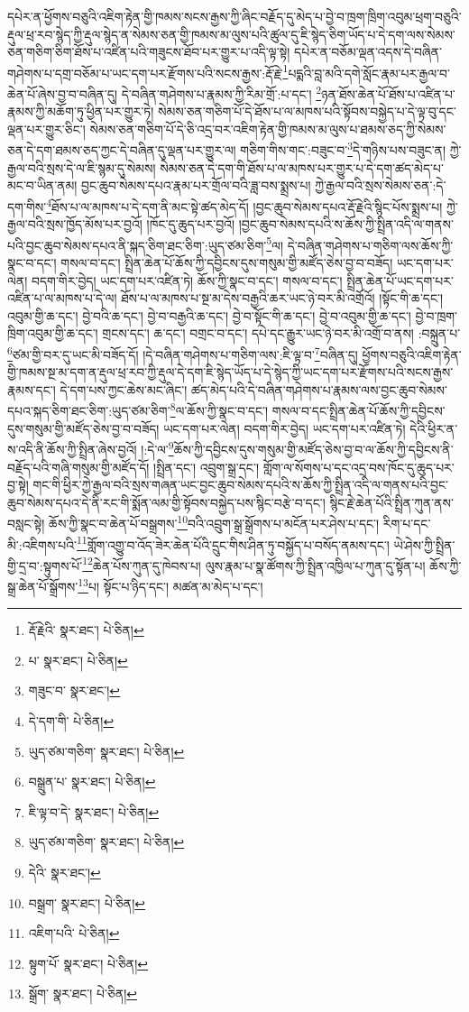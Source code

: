 དཔེར་ན་ཕྱོགས་བཅུའི་འཇིག་རྟེན་གྱི་ཁམས་སངས་རྒྱས་ཀྱི་ཞིང་བརྗོད་དུ་མེད་པ་བྱེ་བ་ཁྲག་ཁྲིག་འབུམ་ཕྲག་བཅུའི་རྡུལ་ཕྲ་རབ་སྙེད་ཀྱི་རྡུལ་སྙེད་ན་སེམས་ཅན་གྱི་ཁམས་མ་ལུས་པའི་ཚུལ་དུ་ཇི་སྙེད་ཅིག་ཡོད་པ་དེ་དག་ལས་སེམས་ཅན་གཅིག་ཅིག་ཐོས་པ་འཛིན་པའི་གཟུངས་ཐོབ་པར་གྱུར་པ་འདི་ལྟ་སྟེ། དཔེར་ན་བཅོམ་ལྡན་འདས་དེ་བཞིན་གཤེགས་པ་དགྲ་བཅོམ་པ་ཡང་དག་པར་རྫོགས་པའི་སངས་རྒྱས་:རྡོ་རྗེ་\footnote{རྡོ་རྗེའི་  སྣར་ཐང་།  པེ་ཅིན། }པདྨའི་བླ་མའི་དགེ་སློང་རྣམ་པར་རྒྱལ་བ་ཆེན་པོ་ཞེས་བྱ་བ་བཞིན་དུ། དེ་བཞིན་གཤེགས་པ་རྣམས་ཀྱི་རིམ་གྲོ་:པ་དང་། \footnote{པ་  སྣར་ཐང་།  པེ་ཅིན། }ཉན་ཐོས་ཆེན་པོ་ཐོས་པ་འཛིན་པ་རྣམས་ཀྱི་མཆོག་ཏུ་ཕྱིན་པར་གྱུར་ཏེ། སེམས་ཅན་གཅིག་པོ་དེ་ཐོས་པ་ལ་མཁས་པའི་སྟོབས་བསྐྱེད་པ་དེ་ལྟ་བུ་དང་ལྡན་པར་གྱུར་ཅིང་། སེམས་ཅན་གཅིག་པོ་དེ་ཅི་འདྲ་བར་འཇིག་རྟེན་གྱི་ཁམས་མ་ལུས་པ་ཐམས་ཅད་ཀྱི་སེམས་ཅན་དེ་དག་ཐམས་ཅད་ཀྱང་དེ་བཞིན་དུ་ལྡན་པར་གྱུར་ལ། གཅིག་གིས་གང་:བཟུང་བ་\footnote{གཟུང་བ་  སྣར་ཐང་། }དེ་གཉིས་པས་བཟུང་ན། ཀྱེ་རྒྱལ་བའི་སྲས་དེ་ལ་ཇི་སྙམ་དུ་སེམས། སེམས་ཅན་དེ་དག་གི་ཐོས་པ་ལ་མཁས་པར་གྱུར་པ་དེ་དག་ཚད་མེད་པ་མང་བ་ཡིན་ནམ། བྱང་ཆུབ་སེམས་དཔའ་རྣམ་པར་གྲོལ་བའི་ཟླ་བས་སྨྲས་པ། ཀྱེ་རྒྱལ་བའི་སྲས་སེམས་ཅན་:དེ་དག་གིས་\footnote{དེ་དག་གི་  པེ་ཅིན། }ཐོས་པ་ལ་མཁས་པ་དེ་དག་ནི་མང་སྟེ་ཚད་མེད་དོ། །བྱང་ཆུབ་སེམས་དཔའ་རྡོ་རྗེའི་སྙིང་པོས་སྨྲས་པ། ཀྱེ་རྒྱལ་བའི་སྲས་ཁྱོད་མོས་པར་བྱའོ། །ཁོང་དུ་ཆུད་པར་བྱའོ། །བྱང་ཆུབ་སེམས་དཔའི་ས་ཆོས་ཀྱི་སྤྲིན་འདི་ལ་གནས་པའི་བྱང་ཆུབ་སེམས་དཔའ་ནི་སྐད་ཅིག་ཐང་ཅིག་:ཡུད་ཙམ་ཅིག་\footnote{ཡུད་ཙམ་གཅིག་  སྣར་ཐང་།  པེ་ཅིན། }ལ། དེ་བཞིན་གཤེགས་པ་གཅིག་ལས་ཆོས་ཀྱི་སྣང་བ་དང་། གསལ་བ་དང་། སྤྲིན་ཆེན་པོ་ཆོས་ཀྱི་དབྱིངས་དུས་གསུམ་གྱི་མཛོད་ཅེས་བྱ་བ་བཟོད། ཡང་དག་པར་ལེན། བདག་གིར་བྱེད། ཡང་དག་པར་འཛིན་ཏེ། ཆོས་ཀྱི་སྣང་བ་དང་། གསལ་བ་དང་། སྤྲིན་ཆེན་པོ་ཡང་དག་པར་འཛིན་པ་ལ་མཁས་པ་དེ་ལ། ཐོས་པ་ལ་མཁས་པ་སྔ་མ་དེས་བརྒྱའི་ཆར་ཡང་ཉེ་བར་མི་འགྲོའོ། །སྟོང་གི་ཆ་དང་། འབུམ་གྱི་ཆ་དང་། བྱེ་བའི་ཆ་དང་། བྱེ་བ་བརྒྱའི་ཆ་དང་། བྱེ་བ་སྟོང་གི་ཆ་དང་། བྱེ་བ་འབུམ་གྱི་ཆ་དང་། བྱེ་བ་ཁྲག་ཁྲིག་འབུམ་གྱི་ཆ་དང་། གྲངས་དང་། ཆ་དང་། བགྲང་བ་དང་། དཔེ་དང་རྒྱུར་ཡང་ཉེ་བར་མི་འགྲོ་བ་ནས། :བསྐྲུན་པ་\footnote{བསྒྲུན་པ་  སྣར་ཐང་།  པེ་ཅིན། }ཙམ་གྱི་བར་དུ་ཡང་མི་བཟོད་དོ། །དེ་བཞིན་གཤེགས་པ་གཅིག་ལས་:ཇི་ལྟ་བ་\footnote{ཇི་ལྟ་བ་དེ་  སྣར་ཐང་།  པེ་ཅིན། }བཞིན་དུ། ཕྱོགས་བཅུའི་འཇིག་རྟེན་གྱི་ཁམས་སྔ་མ་དག་ན་རྡུལ་ཕྲ་རབ་ཀྱི་རྡུལ་དེ་དག་ཇི་སྙེད་ཡོད་པ་དེ་སྙེད་ཀྱི་ཡང་དག་པར་རྫོགས་པའི་སངས་རྒྱས་རྣམས་དང་། དེ་དག་པས་ཀྱང་ཆེས་མང་ཞིང་། ཚད་མེད་པའི་དེ་བཞིན་གཤེགས་པ་རྣམས་ལས་བྱང་ཆུབ་སེམས་དཔའ་སྐད་ཅིག་ཐང་ཅིག་:ཡུད་ཙམ་ཅིག་\footnote{ཡུད་ཙམ་གཅིག་  སྣར་ཐང་།  པེ་ཅིན། }ལ་ཆོས་ཀྱི་སྣང་བ་དང་། གསལ་བ་དང་སྤྲིན་ཆེན་པོ་ཆོས་ཀྱི་དབྱིངས་དུས་གསུམ་གྱི་མཛོད་ཅེས་བྱ་བ་བཟོད། ཡང་དག་པར་ལེན། བདག་གིར་བྱེད། ཡང་དག་པར་འཛིན་ཏེ། དེའི་ཕྱིར་ན་ས་འདི་ནི་ཆོས་ཀྱི་སྤྲིན་ཞེས་བྱའོ། །:དེ་ལ་\footnote{དེའི་  སྣར་ཐང་། }ཆོས་ཀྱི་དབྱིངས་དུས་གསུམ་གྱི་མཛོད་ཅེས་བྱ་བ་ལ་ཆོས་ཀྱི་དབྱིངས་ནི་བརྗོད་པའི་གཞི་གསུམ་གྱི་མཛོད་དོ། །སྤྲིན་དང་། འབྲུག་སྒྲ་དང་། གློག་ལ་སོགས་པ་དང་འདྲ་བས་ཁོང་དུ་ཆུད་པར་བྱ་སྟེ། གང་གི་ཕྱིར་ཀྱེ་རྒྱལ་བའི་སྲས་གཞན་ཡང་བྱང་ཆུབ་སེམས་དཔའི་ས་ཆོས་ཀྱི་སྤྲིན་འདི་ལ་གནས་པའི་བྱང་ཆུབ་སེམས་དཔའ་དེ་ནི་རང་གི་སྨོན་ལམ་གྱི་སྟོབས་བསྐྱེད་པས་སྙིང་བརྩེ་བ་དང་། སྙིང་རྗེ་ཆེན་པོའི་སྤྲིན་ཀུན་ནས་བསླང་སྟེ། ཆོས་ཀྱི་སྣང་བ་ཆེན་པོ་བསྒྲགས་\footnote{བསྒྲག་  སྣར་ཐང་།  པེ་ཅིན། }བའི་འབྲུག་སྒྲ་སྒྲོགས་པ་མངོན་པར་ཤེས་པ་དང་། རིག་པ་དང་མི་:འཇིགས་པའི་\footnote{འཇིག་པའི་  པེ་ཅིན། }གློག་འགྱུ་བ་འོད་ཟེར་ཆེན་པོའི་དྲུང་གིས་ཤིན་ཏུ་བསྐྱོད་པ་བསོད་ནམས་དང་། ཡེ་ཤེས་ཀྱི་སྤྲིན་གྱི་དྲ་བ་:སྟུགས་པོ་\footnote{སྟུག་པོ་  སྣར་ཐང་།  པེ་ཅིན། }ཆེན་པོས་ཀུན་དུ་ཁེབས་པ། ལུས་རྣམ་པ་སྣ་ཚོགས་ཀྱི་སྤྲིན་འཁྱིལ་པ་ཀུན་དུ་སྟོན་པ། ཆོས་ཀྱི་སྒྲ་ཆེན་པོ་སྒྲོགས་\footnote{སྒྲོག་  སྣར་ཐང་།  པེ་ཅིན། }པ། སྟོང་པ་ཉིད་དང་། མཚན་མ་མེད་པ་དང་། 